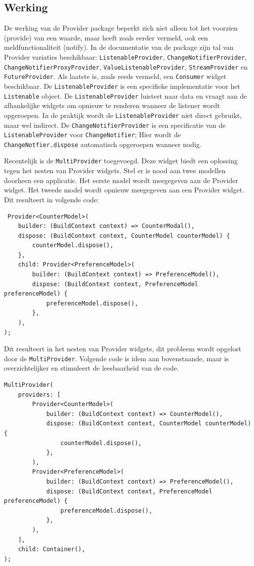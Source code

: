 \subsection*{Werking}
De werking van de Provider package beperkt zich niet alleen tot het voorzien (provide) van een waarde, maar heeft zoals eerder vermeld, ook een meldfunctionaliteit (notify).
In de documentatie van de package zijn tal van Provider variaties beschikbaar: \verb|ListenableProvider|, \verb|ChangeNotifierProvider|, \verb|ChangeNotifierProxyProvider|, \verb|ValueListenableProvider|, \verb|StreamProvider| en \verb|FutureProvider|. Als laatste is, zoals reeds vermeld, een \verb|Consumer| widget beschikbaar.
De \verb|ListenableProvider| is een specifieke implementatie voor het \verb|Listenable| object. De \verb|ListenableProvider| luistert naar data en vraagt aan de afhankelijke widgets om opnieuw te renderen wanneer de listener wordt opgeroepen. In de praktijk wordt de \verb|ListenableProvider| niet direct gebruikt, maar wel indirect. De \verb|ChangeNotifierProvider| is een specificatie van de \verb|ListenableProvider| voor \verb|ChangeNotifier|; Hier wordt de \verb|ChangeNotfier.dispose| automatisch opgeroepen wanneer nodig.

Recentelijk is de \verb|MultiProvider| toegevoegd. Deze widget biedt een oplossing tegen het nesten van Provider widgets. Stel er is nood aan twee modellen doorheen een applicatie. Het eerste model wordt meegegeven aan de Provider widget. Het tweede model wordt opnieuw meegegeven aan een Provider widget. Dit resulteert in volgende code:
 \begin{verbatim}
 Provider<CounterModel>(
    builder: (BuildContext context) => CounterModal(),
    dispose: (BuildContext context, CounterModel counterModel) {
        counterModel.dispose(),
    },
    child: Provider<PreferenceModel>(
        builder: (BuildContext context) => PreferenceModel(),
        dispose: (BuildContext context, PreferenceModel preferenceModel) {
            preferenceModel.dispose(),
        },
    ),
);
\end{verbatim}
Dit resulteert in het nesten van Provider widgets, dit probleem wordt opgelost door de \verb|MultiProvider|. Volgende code is idem aan bovenstaande, maar is overzichtelijker en stimuleert de leesbaarheid van de code.
 \begin{verbatim}
MultiProvider(
    providers: [
        Provider<CounterModel>(
            builder: (BuildContext context) => CounterModel(),
            dispose: (BuildContext context, CounterModel counterModel) {
                counterModel.dispose(),
            },
        ),
        Provider<PreferenceModel>(
            builder: (BuildContext context) => PreferenceModel(),
            dispose: (BuildContext context, PreferenceModel preferenceModel) {
                preferenceModel.dispose(),
            },
        ),
    ],
    child: Container(),
);

\end{verbatim}

